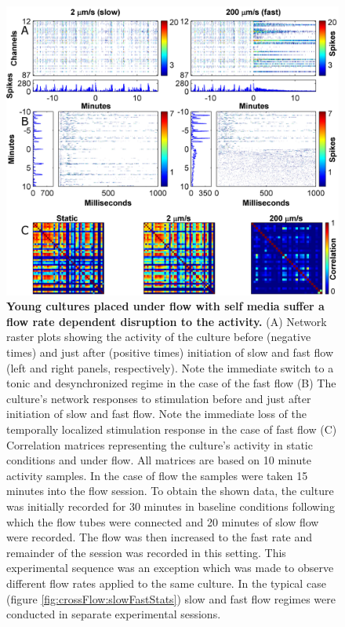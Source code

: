         \begin{figure}[!htb]
            \centering
            \includegraphics[width=15cm]{chapter5/figures/slowFastExample/slowFastExample.jpg}
            \caption[Example for the Effect of flow rate on the activity of a young culture under flow]{\textbf{Young cultures placed under flow with self media suffer a flow rate dependent disruption to the activity.} (A) Network raster plots showing the activity of the culture before (negative times) and just after (positive times) initiation of slow and fast flow (left and right panels, respectively). Note the immediate switch to a tonic and desynchronized regime in the case of the fast flow (B) The culture's network responses to stimulation before and just after initiation of slow and fast flow. Note the immediate loss of the temporally localized stimulation response in the case of fast flow (C) Correlation matrices representing the culture's activity in static conditions and under flow. All matrices are based on 10 minute activity samples. In the case of flow the samples were taken 15 minutes into the flow session. To obtain the shown data, the culture was initially recorded for 30 minutes in baseline conditions following which the flow tubes were connected and 20 minutes of slow flow were recorded. The flow was then increased to the fast rate and remainder of the session was recorded in this setting. This experimental sequence was an exception which was made to observe different flow rates applied to the same culture. In the typical case (figure \ref{fig:crossFlow:slowFastStats}) slow and fast flow regimes were conducted in separate experimental sessions.}
            \label{fig:crossFlow:slowFastExample}
        \end{figure}

